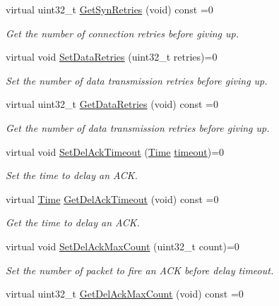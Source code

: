\begin{DoxyCompactItemize}
virtual uint32\+\_\+t \hyperlink{classns3_1_1TcpSocket_a80d5ebdbc7400325e1a76ad0c1f93e06}{Get\+Syn\+Retries} (void) const =0
\begin{DoxyCompactList}\small\item\em Get the number of connection retries before giving up. \end{DoxyCompactList}\item 
virtual void \hyperlink{classns3_1_1TcpSocket_ac56c8dc614fc35836105b6bb9351e021}{Set\+Data\+Retries} (uint32\+\_\+t retries)=0
\begin{DoxyCompactList}\small\item\em Set the number of data transmission retries before giving up. \end{DoxyCompactList}\item 
virtual uint32\+\_\+t \hyperlink{classns3_1_1TcpSocket_a405c339d8ed65ddfac6cd99827a1f019}{Get\+Data\+Retries} (void) const =0
\begin{DoxyCompactList}\small\item\em Get the number of data transmission retries before giving up. \end{DoxyCompactList}\item 
virtual void \hyperlink{classns3_1_1TcpSocket_acaa9a24ec3438c0d100b0f5449a18a33}{Set\+Del\+Ack\+Timeout} (\hyperlink{classns3_1_1Time}{Time} \hyperlink{openflow-switch_8cc_a386d174ae121d1cfa279074b7e209714}{timeout})=0
\begin{DoxyCompactList}\small\item\em Set the time to delay an A\+CK. \end{DoxyCompactList}\item 
virtual \hyperlink{classns3_1_1Time}{Time} \hyperlink{classns3_1_1TcpSocket_ad2f42e0b4f6bfa6fde17c4e94a176ccc}{Get\+Del\+Ack\+Timeout} (void) const =0
\begin{DoxyCompactList}\small\item\em Get the time to delay an A\+CK. \end{DoxyCompactList}\item 
virtual void \hyperlink{classns3_1_1TcpSocket_a31468da4fd4dfc9955caa6cb16b45973}{Set\+Del\+Ack\+Max\+Count} (uint32\+\_\+t count)=0
\begin{DoxyCompactList}\small\item\em Set the number of packet to fire an A\+CK before delay timeout. \end{DoxyCompactList}\item 
virtual uint32\+\_\+t \hyperlink{classns3_1_1TcpSocket_a571678fa845c306375810bfe9b48d43e}{Get\+Del\+Ack\+Max\+Count} (void) const =0

\end{DoxyCompactItemize}
